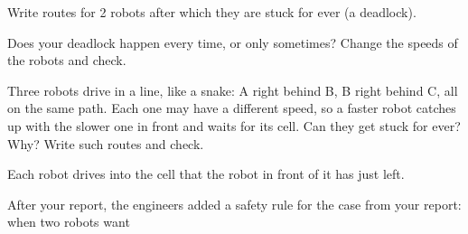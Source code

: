 \begin{questions}
  \item Write routes for 2 robots after which they are stuck for ever (a deadlock).
  \item Does your deadlock happen every time, or only sometimes? Change the speeds of the robots and check.
  \item Three robots drive in a line, like a snake: A right behind B, B right behind C, all on the same path.
        Each one may have a different speed, so a faster robot catches up with the slower one in front and waits
        for its cell. Can they get stuck for ever? Why? Write such routes and check.
        \begin{center}
        \end{center}
        Each robot drives into the cell that the robot in front of it has just left.
  \item After your report, the engineers added a safety rule for the case from your report: when two robots want

\end{questions}
